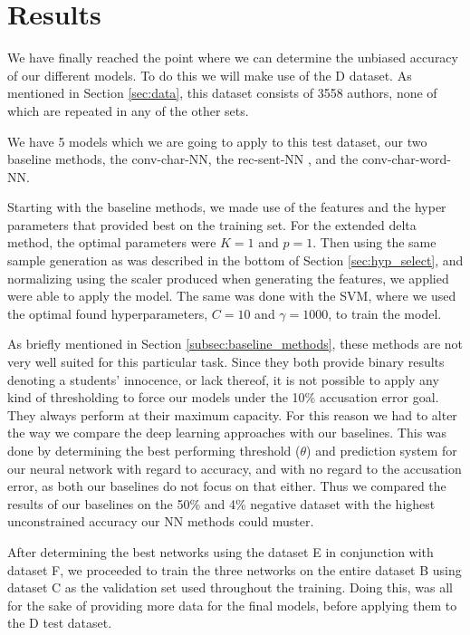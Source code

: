 \section{Results} \label{sec:results}

We have finally reached the point where we can determine the unbiased accuracy
of our different models. To do this we will make use of the \gls{D} dataset. As
mentioned in Section \ref{sec:data}, this dataset consists of 3558 authors, none
of which are repeated in any of the other sets.

We have 5 models which we are going to apply to this test dataset, our
two baseline methods, the \gls{conv-char-NN}, the \gls{rec-sent-NN} , and the
\gls{conv-char-word-NN}.

Starting with the baseline methods, we made use of the features and the
hyper parameters that provided best on the training set. For the extended
delta method, the optimal parameters were $K=1$ and $p = 1$. Then using
the same sample generation as was described in the bottom of Section
\ref{sec:hyp_select}, and normalizing using the scaler produced when generating
the features, we applied were able to apply the model. The same was done with
the \gls{SVM}, where we used the optimal found hyperparameters, $C=10$ and
$\gamma = 1000$, to train the model.

As briefly mentioned in Section \ref{subsec:baseline_methods}, these methods
are not very well suited for this particular task. Since they both provide
binary results denoting a students' innocence, or lack thereof, it is not
possible to apply any kind of thresholding to force our models under the 10\%
accusation error goal. They always perform at their maximum capacity. For this
reason we had to alter the way we compare the deep learning approaches with our
baselines. This was done by determining the best performing threshold ($\theta$)
and prediction system for our neural network with regard to accuracy, and with
no regard to the accusation error, as both our baselines do not focus on that
either. Thus we compared the results of our baselines on the 50\% and 4\%
negative dataset with the highest unconstrained accuracy our \gls{NN} methods
could muster.

After determining the best networks using the dataset \gls{E} in conjunction
with dataset \gls{F}, we proceeded to train the three networks on the entire
dataset \gls{B} using dataset \gls{C} as the validation set used throughout the
training. Doing this, was all for the sake of providing more data for the final
models, before applying them to the \gls{D} test dataset.

